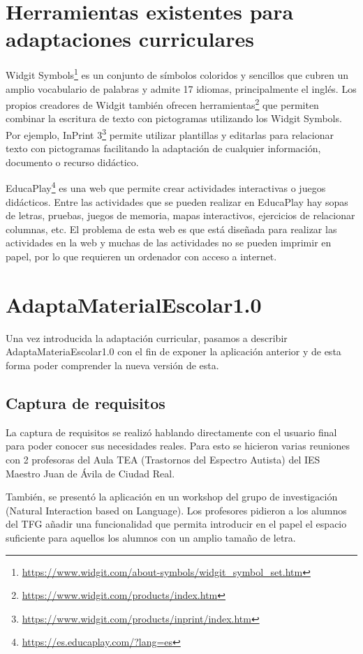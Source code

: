 \section{Herramientas existentes para adaptaciones curriculares}
Widgit Symbols\footnote{\url{https://www.widgit.com/about-symbols/widgit_symbol_set.htm}} es un conjunto de símbolos coloridos y sencillos que cubren un amplio vocabulario de palabras y admite 17 idiomas, principalmente el inglés. Los propios creadores de Widgit también ofrecen herramientas\footnote{\url{https://www.widgit.com/products/index.htm}} que permiten combinar la escritura de texto con pictogramas utilizando los Widgit Symbols. Por ejemplo, InPrint 3\footnote{\url{https://www.widgit.com/products/inprint/index.htm}} permite utilizar plantillas y editarlas para relacionar texto con pictogramas facilitando la adaptación de cualquier información, documento o recurso didáctico.

EducaPlay\footnote{\url{https://es.educaplay.com/?lang=es}} es una web que permite crear actividades interactivas o juegos didácticos. Entre las actividades que se pueden realizar en EducaPlay hay sopas de letras, pruebas, juegos de memoria, mapas interactivos, ejercicios de relacionar columnas, etc. El problema de esta web es que está diseñada para realizar las actividades en la web y muchas de las actividades no se pueden imprimir en papel, por lo que requieren un ordenador con acceso a internet. 

\section{AdaptaMaterialEscolar1.0}

Una vez introducida la adaptación curricular, pasamos a describir AdaptaMateriaEscolar1.0 con el fin de exponer la aplicación anterior y de esta forma poder comprender la nueva versión de esta. 


\subsection{Captura de requisitos}
La captura de requisitos se realizó hablando directamente con el usuario final para poder conocer sus necesidades reales. Para esto se hicieron varias reuniones con 2 profesoras del Aula TEA (Trastornos del Espectro Autista) del IES Maestro Juan de Ávila de Ciudad Real.

También, se presentó la aplicación en un workshop del grupo de investigación (Natural Interaction based on Language). Los profesores pidieron a los alumnos del TFG añadir una funcionalidad que permita introducir en el papel el espacio suficiente para aquellos los alumnos con un amplio tamaño de letra.

